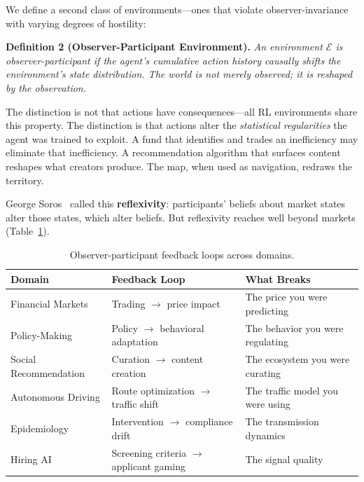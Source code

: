 \documentclass[11pt,a4paper]{article}
\begin{document}
We define a second class of environments---ones that violate observer-invariance with varying degrees of hostility:

\vspace{0.5em}
\noindent\textbf{Definition 2 (Observer-Participant Environment).} \textit{An environment $\mathcal{E}$ is observer-participant if the agent's cumulative action history causally shifts the environment's state distribution. The world is not merely observed; it is reshaped by the observation.}
\vspace{0.5em}

The distinction is not that actions have consequences---all RL environments share this property. The distinction is that actions alter the \textit{statistical regularities} the agent was trained to exploit. A fund that identifies and trades an inefficiency may eliminate that inefficiency. A recommendation algorithm that surfaces content reshapes what creators produce. The map, when used as navigation, redraws the territory.

George Soros~\citep{soros1987} called this \textbf{reflexivity}: participants' beliefs about market states alter those states, which alter beliefs. But reflexivity reaches well beyond markets (Table~\ref{tab:observer-participant}).

\begin{table}[h]
\centering
\caption{Observer-participant feedback loops across domains.}
\label{tab:observer-participant}
\begin{tabular}{@{}lll@{}}
\toprule
\textbf{Domain} & \textbf{Feedback Loop} & \textbf{What Breaks} \\
\midrule
Financial Markets & Trading $\to$ price impact & The price you were predicting \\
Policy-Making & Policy $\to$ behavioral adaptation & The behavior you were regulating \\
Social Recommendation & Curation $\to$ content creation & The ecosystem you were curating \\
Autonomous Driving & Route optimization $\to$ traffic shift & The traffic model you were using \\
Epidemiology & Intervention $\to$ compliance drift & The transmission dynamics \\
Hiring AI & Screening criteria $\to$ applicant gaming & The signal quality \\
\bottomrule
\end{tabular}
\end{table}
\end{document}
